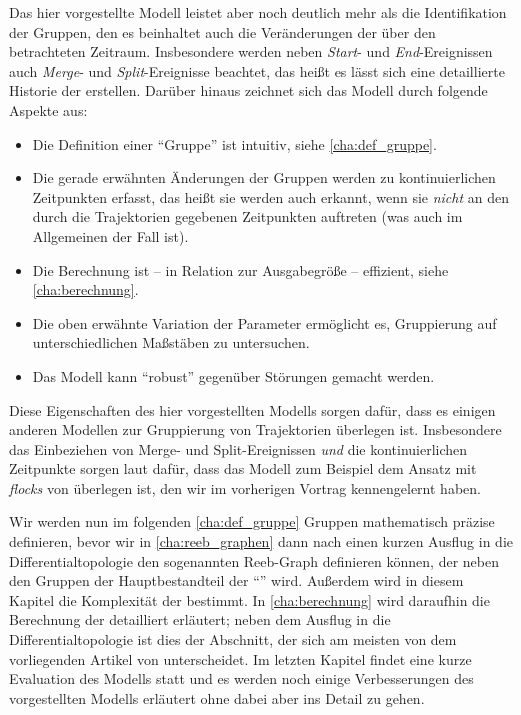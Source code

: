 Das hier vorgestellte Modell leistet aber noch deutlich mehr als die Identifikation der Gruppen, den es beinhaltet auch die Veränderungen der \GrpStruktur über den betrachteten Zeitraum.
Insbesondere werden neben \emph{Start}- und \emph{End}-Ereignissen auch \emph{Merge}- und \emph{Split}-Ereignisse beachtet, das heißt es lässt sich eine detaillierte Historie der \GrpStruktur erstellen.
Darüber hinaus zeichnet sich das Modell durch folgende Aspekte aus:
\begin{itemize}
	\item Die Definition einer \enquote{Gruppe} ist intuitiv, siehe \cref{cha:def_gruppe}.
	\item Die gerade erwähnten Änderungen der Gruppen werden zu kontinuierlichen Zeitpunkten erfasst, das heißt sie werden auch erkannt, wenn sie \emph{nicht} an den durch die Trajektorien gegebenen Zeitpunkten auftreten (was auch im Allgemeinen der Fall ist).
	\item Die Berechnung ist -- in Relation zur Ausgabegröße -- effizient, siehe \cref{cha:berechnung}.
	\item Die oben erwähnte Variation der Parameter ermöglicht es, Gruppierung auf unterschiedlichen Maßstäben zu untersuchen.
	\item Das Modell kann \enquote{robust} gegenüber Störungen gemacht werden.
\end{itemize}
Diese Eigenschaften des hier vorgestellten Modells sorgen dafür, dass es einigen anderen Modellen zur Gruppierung von Trajektorien überlegen ist. 
Insbesondere das Einbeziehen von Merge- und Split-Ereignissen \emph{und} die kontinuierlichen Zeitpunkte sorgen laut \textcite{buchin2015} dafür, dass das Modell zum Beispiel dem Ansatz mit \emph{flocks} von \textcite{benkert_flocks} überlegen ist, den wir im vorherigen Vortrag kennengelernt haben.

Wir werden nun im folgenden \cref{cha:def_gruppe} Gruppen mathematisch präzise definieren, bevor wir in \cref{cha:reeb_graphen} dann nach einen kurzen Ausflug in die Differentialtopologie den sogenannten Reeb-Graph definieren können, der neben den Gruppen der Hauptbestandteil der \enquote{\GrpStruktur} wird.
Außerdem wird in diesem Kapitel die Komplexität der \GrpStruktur bestimmt.
In \cref{cha:berechnung} wird daraufhin die Berechnung der \GrpStruktur detailliert erläutert; neben dem Ausflug in die Differentialtopologie ist dies der Abschnitt, der sich am meisten von dem vorliegenden Artikel von \textcite{buchin2015} unterscheidet.
Im letzten Kapitel findet eine kurze Evaluation des Modells statt und es werden noch einige Verbesserungen des vorgestellten Modells erläutert ohne dabei aber ins Detail zu gehen. 

